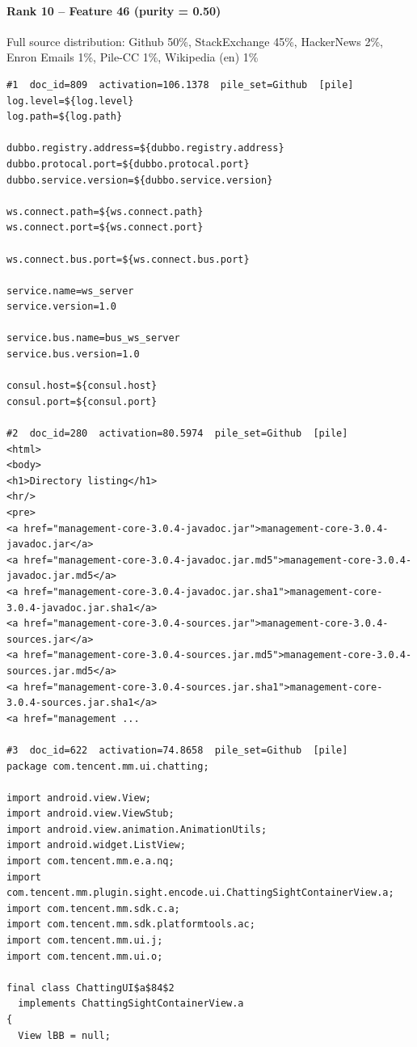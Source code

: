 \paragraph*{Rank 10 -- Feature 46 (purity = 0.50)}

Full source distribution: Github 50\%, StackExchange 45\%, HackerNews 2\%, Enron Emails 1\%, Pile-CC 1\%, Wikipedia (en) 1\%

\begin{verbatim}
#1  doc_id=809  activation=106.1378  pile_set=Github  [pile]
log.level=${log.level}
log.path=${log.path}

dubbo.registry.address=${dubbo.registry.address}
dubbo.protocal.port=${dubbo.protocal.port}
dubbo.service.version=${dubbo.service.version}

ws.connect.path=${ws.connect.path}
ws.connect.port=${ws.connect.port}

ws.connect.bus.port=${ws.connect.bus.port}

service.name=ws_server
service.version=1.0

service.bus.name=bus_ws_server
service.bus.version=1.0

consul.host=${consul.host}
consul.port=${consul.port}

#2  doc_id=280  activation=80.5974  pile_set=Github  [pile]
<html>
<body>
<h1>Directory listing</h1>
<hr/>
<pre>
<a href="management-core-3.0.4-javadoc.jar">management-core-3.0.4-javadoc.jar</a>
<a href="management-core-3.0.4-javadoc.jar.md5">management-core-3.0.4-javadoc.jar.md5</a>
<a href="management-core-3.0.4-javadoc.jar.sha1">management-core-3.0.4-javadoc.jar.sha1</a>
<a href="management-core-3.0.4-sources.jar">management-core-3.0.4-sources.jar</a>
<a href="management-core-3.0.4-sources.jar.md5">management-core-3.0.4-sources.jar.md5</a>
<a href="management-core-3.0.4-sources.jar.sha1">management-core-3.0.4-sources.jar.sha1</a>
<a href="management ...

#3  doc_id=622  activation=74.8658  pile_set=Github  [pile]
package com.tencent.mm.ui.chatting;

import android.view.View;
import android.view.ViewStub;
import android.view.animation.AnimationUtils;
import android.widget.ListView;
import com.tencent.mm.e.a.nq;
import com.tencent.mm.plugin.sight.encode.ui.ChattingSightContainerView.a;
import com.tencent.mm.sdk.c.a;
import com.tencent.mm.sdk.platformtools.ac;
import com.tencent.mm.ui.j;
import com.tencent.mm.ui.o;

final class ChattingUI$a$84$2
  implements ChattingSightContainerView.a
{
  View lBB = null;
  

\end{verbatim}
